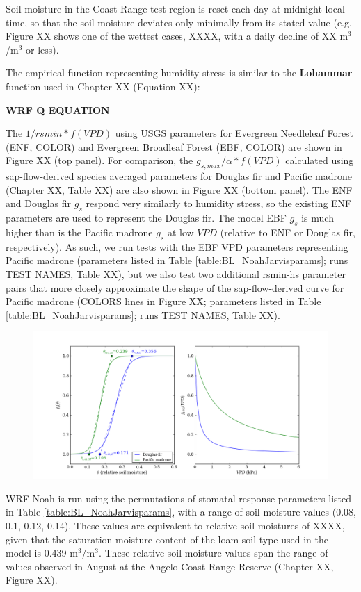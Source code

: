 Soil moisture in the Coast Range test region is reset each day at midnight local time, so that the soil moisture deviates only minimally from its stated value (e.g. Figure XX shows one of the wettest cases, XXXX, with a daily decline of XX m$^3$/m$^3$ or less).

The empirical function representing humidity stress is similar to the \textbf{Lohammar} function used in Chapter XX (Equation XX):

\textbf{WRF Q EQUATION}

The $1/rsmin * f(VPD)$ using USGS parameters for Evergreen Needleleaf Forest (ENF, COLOR) and Evergreen Broadleaf Forest (EBF, COLOR) are shown in Figure XX (top panel).  For comparison, the $g_{s, max}/\alpha * f(VPD)$ calculated using sap-flow-derived species averaged parameters for Douglas fir and Pacific madrone (Chapter XX, Table XX) are also shown in Figure XX (bottom panel).  The ENF and Douglas fir $g_s$ respond very similarly to humidity stress, so the existing ENF parameters are used to represent the Douglas fir.  The model EBF $g_s$ is much higher than is the Pacific madrone $g_s$ at low $VPD$ (relative to ENF or Douglas fir, respectively).  As such, we run tests with the EBF VPD parameters representing Pacific madrone (parameters listed in Table \ref{table:BL_NoahJarvisparams}; runs TEST NAMES, Table XX), but we also test two additional rsmin-hs parameter pairs that more closely approximate the shape of the sap-flow-derived curve for Pacific madrone (COLORS lines in Figure XX; parameters listed in Table \ref{table:BL_NoahJarvisparams}; runs TEST NAMES, Table XX).

\begin{figure}[here]
\includegraphics[width=1\textwidth]{ch2-BL/figures/theta_params.png}
\caption{}
\label{fig:BL_FeddesParams}
\end{figure}


WRF-Noah is run using the permutations of stomatal response parameters listed in Table \ref{table:BL_NoahJarvisparams}, with a range of soil moisture values (0.08, 0.1, 0.12, 0.14).  These values are equivalent to relative soil moistures of XXXX, given that the saturation moisture content of the loam soil type used in the model is 0.439 m$^3$/m$^3$.  These relative soil moisture values span the range of values observed in August at the Angelo Coast Range Reserve (Chapter XX, Figure XX).